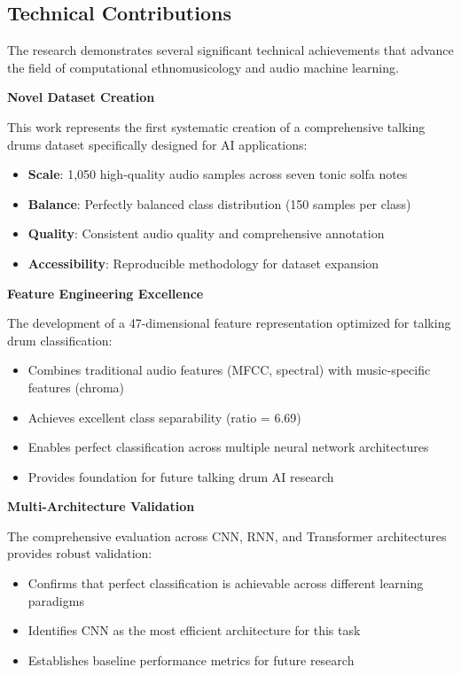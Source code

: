 \documentclass[12pt,a4paper]{article}
\begin{document}
\subsection{Technical Contributions}

The research demonstrates several significant technical achievements that advance the field of computational ethnomusicology and audio machine learning.

\textbf{Novel Dataset Creation}

This work represents the first systematic creation of a comprehensive talking drums dataset specifically designed for AI applications:

\begin{itemize}
\item \textbf{Scale}: 1,050 high-quality audio samples across seven tonic solfa notes
\item \textbf{Balance}: Perfectly balanced class distribution (150 samples per class)
\item \textbf{Quality}: Consistent audio quality and comprehensive annotation
\item \textbf{Accessibility}: Reproducible methodology for dataset expansion
\end{itemize}

\textbf{Feature Engineering Excellence}

The development of a 47-dimensional feature representation optimized for talking drum classification:

\begin{itemize}
\item Combines traditional audio features (MFCC, spectral) with music-specific features (chroma)
\item Achieves excellent class separability (ratio = 6.69)
\item Enables perfect classification across multiple neural network architectures
\item Provides foundation for future talking drum AI research
\end{itemize}

\textbf{Multi-Architecture Validation}

The comprehensive evaluation across CNN, RNN, and Transformer architectures provides robust validation:

\begin{itemize}
\item Confirms that perfect classification is achievable across different learning paradigms
\item Identifies CNN as the most efficient architecture for this task
\item Establishes baseline performance metrics for future research
\end{itemize}
\end{document}
